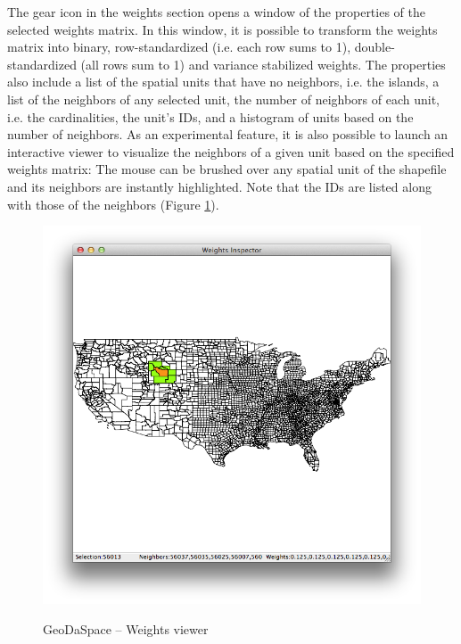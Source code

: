 \documentclass{article}
\begin{document}
The gear icon in the weights section opens a window of the properties of the selected weights matrix. In this window, it is possible to transform the weights matrix into binary, row-standardized (i.e. each row sums to 1), double-standardized (all rows sum to 1) and variance stabilized weights. The properties also include a list of the spatial units that have no neighbors, i.e. the islands, a list of the neighbors of any selected unit, the number of neighbors of each unit, i.e. the cardinalities, the unit's IDs, and a histogram of units based on the number of neighbors. As an experimental feature, it is also possible to launch an interactive viewer to visualize the neighbors of a given unit based on the specified weights matrix: The mouse can be brushed over any spatial unit of the shapefile and its neighbors are instantly highlighted. Note that the IDs are listed along with those of the neighbors (Figure \ref{f:viewer}).

\begin{figure}[htb]
\begin{center}
\includegraphics[width=\linewidth]{viewer.png}\\
\caption{GeoDaSpace -- Weights viewer}
\label{f:viewer}
\end{center}
\end{figure}
\FloatBarrier
\end{document}
